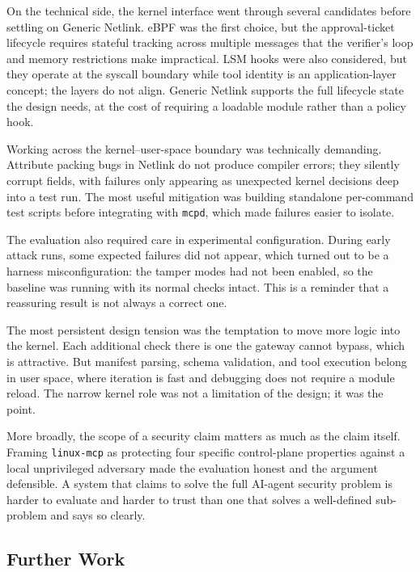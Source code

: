 On the technical side, the kernel interface went through several candidates before settling on Generic Netlink.
eBPF was the first choice, but the approval-ticket lifecycle requires stateful tracking across multiple messages that the verifier's loop and memory restrictions make impractical.
LSM hooks were also considered, but they operate at the syscall boundary while tool identity is an application-layer concept; the layers do not align.
Generic Netlink supports the full lifecycle state the design needs, at the cost of requiring a loadable module rather than a policy hook.

Working across the kernel--user-space boundary was technically demanding.
Attribute packing bugs in Netlink do not produce compiler errors; they silently corrupt fields, with failures only appearing as unexpected kernel decisions deep into a test run.
The most useful mitigation was building standalone per-command test scripts before integrating with \texttt{mcpd}, which made failures easier to isolate.

The evaluation also required care in experimental configuration.
During early attack runs, some expected failures did not appear, which turned out to be a harness misconfiguration: the tamper modes had not been enabled, so the baseline was running with its normal checks intact.
This is a reminder that a reassuring result is not always a correct one.

The most persistent design tension was the temptation to move more logic into the kernel.
Each additional check there is one the gateway cannot bypass, which is attractive.
But manifest parsing, schema validation, and tool execution belong in user space, where iteration is fast and debugging does not require a module reload.
The narrow kernel role was not a limitation of the design; it was the point.

More broadly, the scope of a security claim matters as much as the claim itself.
Framing \texttt{linux-mcp} as protecting four specific control-plane properties against a local unprivileged adversary made the evaluation honest and the argument defensible.
A system that claims to solve the full AI-agent security problem is harder to evaluate and harder to trust than one that solves a well-defined sub-problem and says so clearly.

\subsection{Further Work}
\label{sec:further-work}

